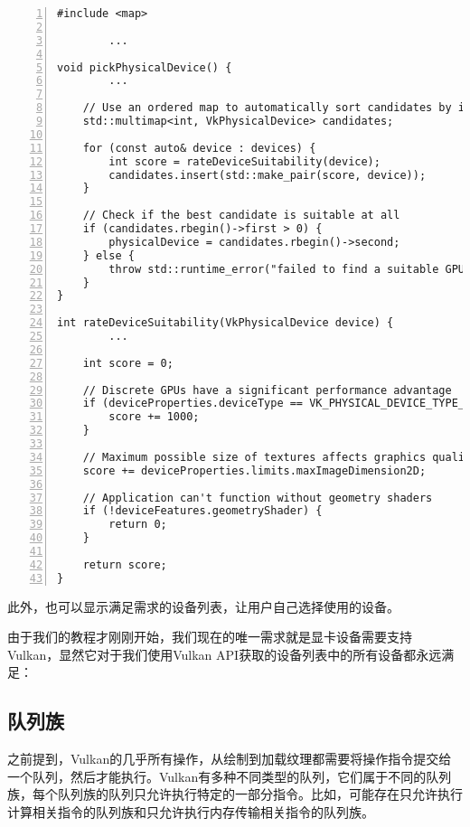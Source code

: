 \documentclass{ctexart}
\begin{document}
\begin{lstlisting}[language={[ANSI]C},keywordstyle=\color{blue!70},commentstyle=\color{red!50!green!50!blue!50},frame=shadowbox, rulesepcolor=\color{red!20!green!20!blue!20},basicstyle=\small,numbers=left, numberstyle=\tiny,breaklines=true]
#include <map>

		...

void pickPhysicalDevice() {
		...

	// Use an ordered map to automatically sort candidates by increasing score
	std::multimap<int, VkPhysicalDevice> candidates;

	for (const auto& device : devices) {
		int score = rateDeviceSuitability(device);
		candidates.insert(std::make_pair(score, device));
	}

	// Check if the best candidate is suitable at all
	if (candidates.rbegin()->first > 0) {
		physicalDevice = candidates.rbegin()->second;
	} else {
		throw std::runtime_error("failed to find a suitable GPU!");
	}
}

int rateDeviceSuitability(VkPhysicalDevice device) {
		...

	int score = 0;

	// Discrete GPUs have a significant performance advantage
	if (deviceProperties.deviceType == VK_PHYSICAL_DEVICE_TYPE_DISCRETE_GPU) {
		score += 1000;
	}

	// Maximum possible size of textures affects graphics quality
	score += deviceProperties.limits.maxImageDimension2D;

	// Application can't function without geometry shaders
	if (!deviceFeatures.geometryShader) {
		return 0;
	}

	return score;
}
\end{lstlisting}

此外，也可以显示满足需求的设备列表，让用户自己选择使用的设备。

由于我们的教程才刚刚开始，我们现在的唯一需求就是显卡设备需要支持Vulkan，显然它对于我们使用Vulkan API获取的设备列表中的所有设备都永远满足：

\subsection{队列族}

之前提到，Vulkan的几乎所有操作，从绘制到加载纹理都需要将操作指令提交给一个队列，然后才能执行。Vulkan有多种不同类型的队列，它们属于不同的队列族，每个队列族的队列只允许执行特定的一部分指令。比如，可能存在只允许执行计算相关指令的队列族和只允许执行内存传输相关指令的队列族。
\end{document}
